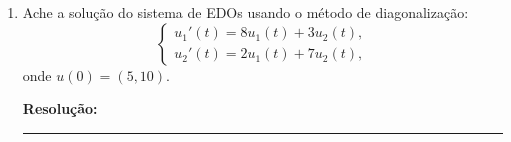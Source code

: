 \documentclass[leqno]{article}
\numberwithin{equation}{section}
\newenvironment{sol} 
{
    \vspace{4mm}
    \noindent\textbf{Resolução:}
    \strut\newline
    \smallskip
    \hspace{-3.5mm} 
} 
{\noindent\rule{4cm}{.1mm}}
\begin{document}
\begin{enumerate}
\begin{enumerate}

\item Ache os autovalores e autovetores de $A$;

\item Ache o limite de $A^n$ quando $n \to +\infty$;

\item Mostre que $G_n$ converge para $2/3$ quando $G_0 = 0$ e $G_1 = 1$.

\end{enumerate}

\begin{sol}

    
\end{sol}


\item Ache a solução do sistema de EDOs usando o método de diagonalização:
$$\begin{cases}
u_1'(t) = 8u_1(t) + 3u_2(t),\\
u_2'(t) = 2u_1(t) + 7u_2(t),
\end{cases}$$
onde $u(0) = (5, 10)$.

\begin{sol}

    
\end{sol}



\end{enumerate}
\end{document}
